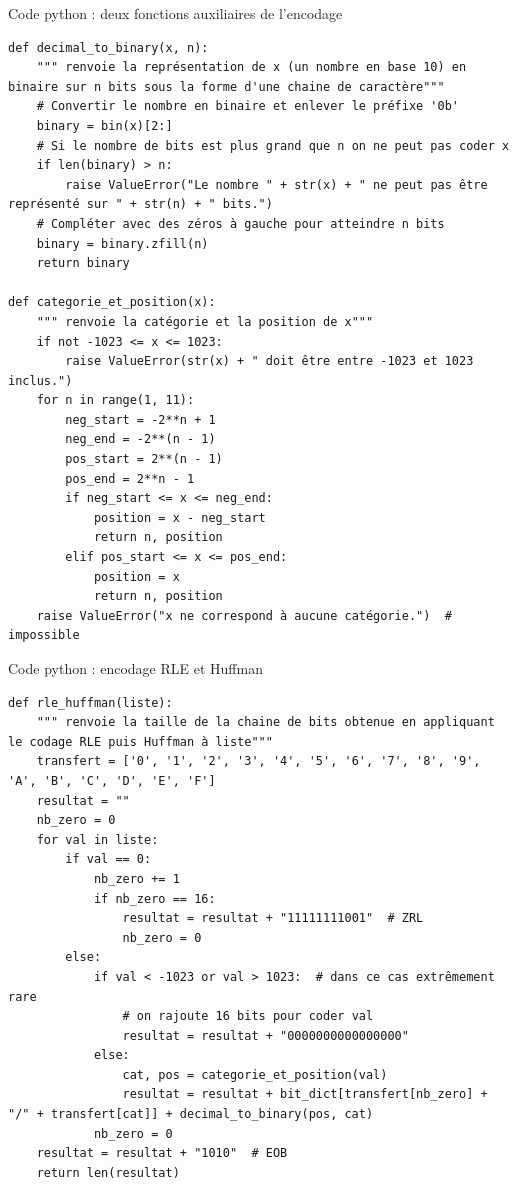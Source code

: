 \documentclass[xcolor=dvipsnames]{beamer}
\begin{document}
\begin{frame}[fragile]{Code python : deux fonctions auxiliaires de l'encodage}
    \begin{lstlisting}[style=pythonStyle]
def decimal_to_binary(x, n):
    """ renvoie la représentation de x (un nombre en base 10) en binaire sur n bits sous la forme d'une chaine de caractère"""
    # Convertir le nombre en binaire et enlever le préfixe '0b'
    binary = bin(x)[2:]
    # Si le nombre de bits est plus grand que n on ne peut pas coder x
    if len(binary) > n:  
        raise ValueError("Le nombre " + str(x) + " ne peut pas être représenté sur " + str(n) + " bits.")
    # Compléter avec des zéros à gauche pour atteindre n bits
    binary = binary.zfill(n)  
    return binary

def categorie_et_position(x):
    """ renvoie la catégorie et la position de x"""
    if not -1023 <= x <= 1023:
        raise ValueError(str(x) + " doit être entre -1023 et 1023 inclus.")
    for n in range(1, 11):
        neg_start = -2**n + 1
        neg_end = -2**(n - 1)
        pos_start = 2**(n - 1)
        pos_end = 2**n - 1
        if neg_start <= x <= neg_end:
            position = x - neg_start
            return n, position
        elif pos_start <= x <= pos_end:
            position = x
            return n, position
    raise ValueError("x ne correspond à aucune catégorie.")  # impossible

    \end{lstlisting}
\end{frame}

\begin{frame}[fragile]{Code python : encodage RLE et Huffman}
    \begin{lstlisting}[style=pythonStyle]
def rle_huffman(liste):
    """ renvoie la taille de la chaine de bits obtenue en appliquant le codage RLE puis Huffman à liste"""
    transfert = ['0', '1', '2', '3', '4', '5', '6', '7', '8', '9', 'A', 'B', 'C', 'D', 'E', 'F']
    resultat = ""
    nb_zero = 0
    for val in liste:
        if val == 0:
            nb_zero += 1
            if nb_zero == 16:
                resultat = resultat + "11111111001"  # ZRL
                nb_zero = 0
        else:
            if val < -1023 or val > 1023:  # dans ce cas extrêmement rare
                # on rajoute 16 bits pour coder val
                resultat = resultat + "0000000000000000"
            else:
                cat, pos = categorie_et_position(val)
                resultat = resultat + bit_dict[transfert[nb_zero] + "/" + transfert[cat]] + decimal_to_binary(pos, cat)
            nb_zero = 0
    resultat = resultat + "1010"  # EOB
    return len(resultat)
    
    \end{lstlisting}
\end{frame}
\end{document}
